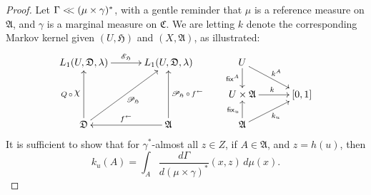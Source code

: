 \documentclass[
twoside=true,
paper=letter,
fontsize=9pt,
pagesize=auto,
leqno,
openany,
headsepline,
overfullrule,
]{scrbook}
\theoremstyle{plain}
\theoremstyle{plain}
\theoremstyle{definition}
\theoremstyle{bfnoteitalic}
\theoremstyle{bfnoteroman}
\newcommand{\sigalg}[1]{\mathfrak{#1}}
\newcommand{\cali}[1]{\mathscr{#1}}
\newcommand{\sfop}[1]{\mathsf{#1}}
\newcommand{\condexpop}[1]{\mathop{\cali{E}\hspace{-1pt}}\nolimits_{#1}}
\newcommand{\condprobop}[1]{\mathop{\cali{P}\hspace{-1pt}}\nolimits_{#1}}
\newcommand{\charfunction}[1]{\mathop{{\raisebox{2pt}{$\chi$}}_{#1}}}
\newcommand{\preimage}[1]{\mathop{#1^{\leftarrow}}}
\newcommand{\sigmaalgebra}{\sigalg{A}}
\newcommand{\sigmaalgebraiii}{\sigalg{C}}
\newcommand{\funch}{h}
\newcommand{\funck}{k}
\newcommand{\function}{f}
\newcommand{\measurespace}{X}
\newcommand{\measurespaceiii}{Z}
\newcommand{\mspaceelt}{x}
\newcommand{\mspaceeltiii}{z}
\newcommand{\abscont}{\mathrel{< \kern-3.5pt <}}
\newcommand{\measure}{\mu}
\newcommand{\measmu}{\mu}
\newcommand{\measureiii}{\lambda}
\newcommand{\seti}{A}
\newcommand{\fixinthefirst}[1]{\sfop{fix}_{#1}}
\newcommand{\fixinthesecond}[1]{\sfop{fix}^{#1}}
\newcommand{\uspace}{U}%
\newcommand{\uspaceelt}{u}
\newcommand{\uspacesig}{\sigalg{D}}
\newcommand{\measonprod}{\Gamma}%
\newcommand{\marginalthree}{\gamma}
\begin{document}
\begin{proof}
Let
$\measonprod\abscont (\measmu\times\marginalthree)^*$, with a gentle reminder that $\measmu$ is a reference measure on $\sigmaalgebra$, and $\marginalthree$ is a marginal measure on
$\sigmaalgebraiii$.
We are letting
$\funck$
denote the corresponding Markov kernel given
$(\uspace,\sigalg{H})$ and $(\measurespace,\sigmaalgebra)$, as illustrated:
\[
\xymatrix@R=16pt@C=30pt{
L_1(\uspace, \uspacesig, \measureiii) \ar[r]^{\condexpop{\sigalg{H}}}
& L_1(\uspace, \uspacesig, \measureiii)
& \uspace
\ar[d]_-{\fixinthesecond{\seti}}
\ar[dr]^{\funck^\seti}
\\
&
& \uspace\times\sigmaalgebra \ar[r]^{\funck}
& [0,1]
\\
\uspacesig
\ar[uu]^{Q\,\circ\,\charfunction{}}
\ar[uur]_{\condprobop{\sigalg{H}}}
& \sigmaalgebra
\ar[uu]_{\condprobop{\sigalg{H}}\circ \preimage{\function}}
\ar[l]_{\preimage{\function}}
& \sigmaalgebra
\ar[u]^{\fixinthefirst{\uspaceelt}}
\ar[ur]_{\funck_\uspaceelt}
&
\\
}
\]
It is sufficient to show that
for $\marginalthree^*$\hyp{}almost all $\mspaceeltiii\in\measurespaceiii$,
if $\seti\in\sigmaalgebra$, and
$\mspaceeltiii = \funch(\uspaceelt)$,
then
\[
\funck_\uspaceelt(\seti)
=
\int_\seti
\frac{d\measonprod}{d(\measure\times\marginalthree)^*}
( \mspaceelt, \mspaceeltiii )
\,d\measmu(\mspaceelt).
\]


\end{proof}
\end{document}
